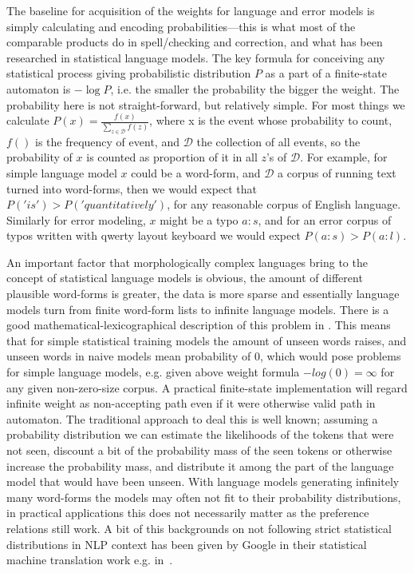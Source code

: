 \documentclass[officiallayout]{unihelcompling}
\begin{document}
The baseline for acquisition of the weights for language and error models is
simply calculating and encoding probabilities---this is what most of the
comparable products do in spell\-/checking and correction, and what has been
researched in statistical language models. The key formula for conceiving any
statistical process giving probabilistic distribution $P$ as a part of a
finite-state automaton is $-\log P$, i.e. the smaller the probability the
bigger the weight. The probability here is not straight-forward, but relatively
simple. For most things we calculate $P(x) = \frac{f(x)}{\sum_{z \in
\mathcal{D}} f(z)}$, where x is the event whose probability to count, $f()$ is
the frequency of event, and $\mathcal{D}$ the collection of all events, so the
probability of $x$ is counted as proportion of it in all $z$'s of
$\mathcal{D}$. For example, for simple language model $x$ could be a word-form,
and $\mathcal{D}$ a corpus of running text turned into word-forms, then we
would expect that $P('is') > P('quantitatively')$, for any reasonable corpus of
English language. Similarly for error modeling, $x$ might be a typo $a:s$, and
for an error corpus of typos written with qwerty layout keyboard we would
expect $P(a:s) > P(a:l)$.

An important factor that morphologically complex languages bring to the
concept of statistical language models is obvious, the amount of different
plausible word-forms is greater, the data is more sparse and essentially
language models turn from finite word-form lists to infinite language models.
There is a good mathematical-lexicographical description of this problem in
\citep{kornai2002many}. This means that for simple statistical training models
the amount of unseen words raises, and unseen words in naive models mean
probability of $0$, which would pose problems for simple language models, e.g.
given above weight formula $-log(0) = \infty$ for any given non-zero-size
corpus. A practical finite-state implementation will regard infinite weight
as non-accepting path even if it were otherwise valid path in automaton. The
traditional approach to deal this is well known;
assuming a probability distribution we can estimate the likelihoods of the
tokens that were not seen, discount a bit of the probability mass of the seen
tokens or otherwise increase the probability mass, and distribute it among the
part of the language model that would have been unseen. With language models
generating infinitely many word-forms the models may often not fit to their
probability distributions, in practical applications this does not necessarily
matter as the preference relations still work. A bit of this backgrounds on not
following strict statistical distributions in NLP context has been given by
Google in their statistical machine translation work e.g. 
in~\citet{brants2007large}.
\end{document}
